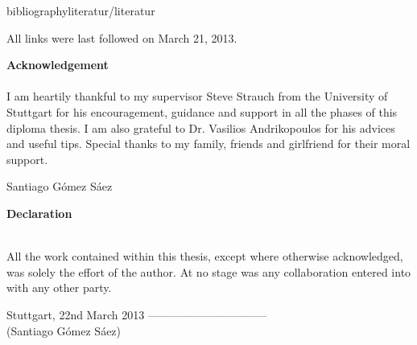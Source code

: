 \documentclass[paper=a4,       %
					 11pt,
					 BCOR0mm,  %
					 DIV10,    %
					 automark, %
					 twoside,
					 halfparskip,
					 bibtotoc,
					 headsepline,
					 normalheadings,
					 appendixprefix,
					 pagesize  %
 ]{scrbook}
\begin{document}
\cleardoubleemptypage


\newpage









bibliography{literatur/literatur}



All links were last followed on March 21, 2013.

\clearpage
\pagestyle{empty}
\vspace{9cm}
\begin{center}
\begin{minipage}{11cm}
\vspace{6cm}

\textbf{\Large Acknowledgement}\\\\
I am heartily thankful to my supervisor Steve Strauch from the University of Stuttgart for his encouragement, guidance and support in all the phases of this diploma thesis. I am also grateful to Dr. Vasilios Andrikopoulos for his advices and useful tips.
Special thanks to my family, friends and girlfriend for their moral support.

\vspace{1cm}
Santiago G\'omez S\'aez

\end{minipage}
\end{center}

\clearpage
\pagestyle{empty}
\vspace{9cm}
\begin{center}
\begin{minipage}{11cm}
\vspace{6cm}

\textbf{\Large Declaration}\\\\
\vspace{0.4cm}

All the work contained within this thesis,
except where otherwise acknowledged, was
solely the effort of the author. At no
stage was any collaboration entered into
with any other party.
\vspace{1cm}

Stuttgart, 22nd March 2013 \hspace{1cm}--------------------------------\\
\phantom{Stuttgart, March 22 2013} \hspace{1.3cm} (Santiago G\'omez S\'aez)
\end{minipage}
\end{center}
\end{document}
